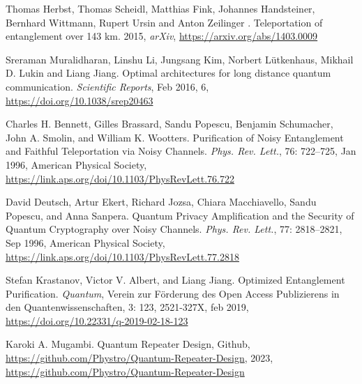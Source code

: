 \documentclass[11pt]{article}
\begin{document}
\begin{thebibliography}{00}
    {Thomas Herbst, Thomas Scheidl, Matthias Fink, Johannes Handsteiner, Bernhard Wittmann, Rupert Ursin and Anton Zeilinger }.
    {Teleportation of entanglement over 143 km}.
    {2015},
    {\sl arXiv},
    {\url{https://arxiv.org/abs/1403.0009}}
    
    {Sreraman Muralidharan, Linshu Li, Jungsang Kim, Norbert Lütkenhaus, Mikhail D. Lukin and  Liang Jiang}.
    {Optimal architectures for long distance quantum communication}.
    {\sl Scientific Reports},
    {Feb}
    {2016},
    {6},
    {\url{https://doi.org/10.1038/srep20463}}    

    {Charles H. Bennett, Gilles Brassard, Sandu Popescu, Benjamin Schumacher, John A. Smolin, and William K. Wootters}.
    {Purification of Noisy Entanglement and Faithful Teleportation via Noisy Channels}.
    {\sl Phys. Rev. Lett.},
    {76}:
    {722--725},
    {Jan}
    {1996},
    {American Physical Society},
    {\url{https://link.aps.org/doi/10.1103/PhysRevLett.76.722}}    

    {David Deutsch, Artur Ekert, Richard Jozsa, Chiara Macchiavello, Sandu Popescu, and  Anna Sanpera}.
    {Quantum Privacy Amplification and the Security of Quantum Cryptography over Noisy Channels}.
    {\sl Phys. Rev. Lett.},
    {77}:
    {2818--2821},
    {Sep}
    {1996},
    {American Physical Society},
    {\url{https://link.aps.org/doi/10.1103/PhysRevLett.77.2818}}
    
    {Stefan Krastanov, Victor V. Albert, and Liang Jiang}.
    {Optimized {E}ntanglement {P}urification}.
    {\sl {Quantum}},
    {{Verein zur F{\"{o}}rderung des Open Access Publizierens in den Quantenwissenschaften}},
    {3}: {123},
    {2521-327X},
    {feb}
    {2019},
    {\url{https://doi.org/10.22331/q-2019-02-18-123}}

    {Karoki A. Mugambi}.
    {Quantum Repeater Design},
    {Github, \url{https://github.com/Phystro/Quantum-Repeater-Design}},
    {2023},
    {\url{https://github.com/Phystro/Quantum-Repeater-Design}}
    
    
\end{thebibliography}
\end{document}
